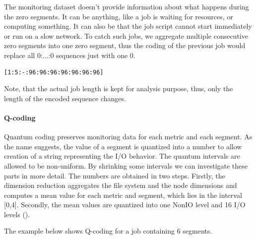 \documentclass{jhps}
\begin{document}
The monitoring dataset doesn't provide information about what happens during the zero segments.
It can be anything, like a job is waiting for resources, or computing something.
It can also be that the job script cannot start immediately or run on a slow network.
To catch such jobs, we aggregate multiple consecutive zero segments into one zero segment, thus the coding of the previous job would replace all 0:...:0 sequences just with one 0.

\begin{lstlisting}[caption={B-coding of a 15 segments long job with zero aggregation applied.}]
[1:5:-:96:96:96:96:96:96:96]
\end{lstlisting}

Note, that the actual job length is kept for analysis purpose, thus, only the length of the encoded sequence changes.

\paragraph*{Q-coding}
Quantum coding preserves monitoring data for each metric and each segment.
As the name suggests, the value of a segment is quantized into a number to allow creation of a string representing the I/O behavior.
The quantum intervals are allowed to be non-uniform.
By shrinking some intervals we can investigate these parts in more detail.
The numbers are obtained in two steps.
Firstly, the dimension reduction aggregates the file system and the node dimensions and computes a mean value for each metric and segment, which lies in the interval [0,4].
Secondly, the mean values are quantized into one NonIO level and 16 I/O levels ().

The example below shows Q-coding for a job containing 6 segments.
\end{document}
